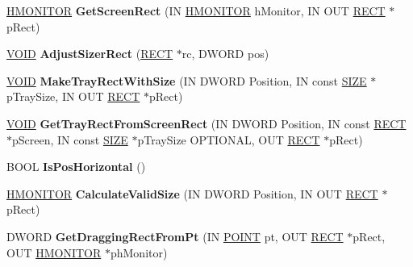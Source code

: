 \begin{DoxyCompactItemize}
\item 
\mbox{\label{class_c_tray_window_a537c0eb82c4cf33f8b74626dc779aaab}} 
\hyperlink{interfacevoid}{H\+M\+O\+N\+I\+T\+OR} {\bfseries Get\+Screen\+Rect} (IN \hyperlink{interfacevoid}{H\+M\+O\+N\+I\+T\+OR} h\+Monitor, IN O\+UT \hyperlink{structtag_r_e_c_t}{R\+E\+CT} $\ast$p\+Rect)
\item 
\mbox{\label{class_c_tray_window_a72dd55c66879592d4effddc7b0a1e25b}} 
\hyperlink{interfacevoid}{V\+O\+ID} {\bfseries Adjust\+Sizer\+Rect} (\hyperlink{structtag_r_e_c_t}{R\+E\+CT} $\ast$rc, D\+W\+O\+RD pos)
\item 
\mbox{\label{class_c_tray_window_abf218198c8b972db23f5551d493c8430}} 
\hyperlink{interfacevoid}{V\+O\+ID} {\bfseries Make\+Tray\+Rect\+With\+Size} (IN D\+W\+O\+RD Position, IN const \hyperlink{structtag_s_i_z_e}{S\+I\+ZE} $\ast$p\+Tray\+Size, IN O\+UT \hyperlink{structtag_r_e_c_t}{R\+E\+CT} $\ast$p\+Rect)
\item 
\mbox{\label{class_c_tray_window_ad9d25ce7a2a612219be8ea07c96a9af0}} 
\hyperlink{interfacevoid}{V\+O\+ID} {\bfseries Get\+Tray\+Rect\+From\+Screen\+Rect} (IN D\+W\+O\+RD Position, IN const \hyperlink{structtag_r_e_c_t}{R\+E\+CT} $\ast$p\+Screen, IN const \hyperlink{structtag_s_i_z_e}{S\+I\+ZE} $\ast$p\+Tray\+Size O\+P\+T\+I\+O\+N\+AL, O\+UT \hyperlink{structtag_r_e_c_t}{R\+E\+CT} $\ast$p\+Rect)
\item 
\mbox{\label{class_c_tray_window_a6b4dc15e30af4f71832f498e6d29c84d}} 
B\+O\+OL {\bfseries Is\+Pos\+Horizontal} ()
\item 
\mbox{\label{class_c_tray_window_a7893aab462204c267634d5d6a88221d9}} 
\hyperlink{interfacevoid}{H\+M\+O\+N\+I\+T\+OR} {\bfseries Calculate\+Valid\+Size} (IN D\+W\+O\+RD Position, IN O\+UT \hyperlink{structtag_r_e_c_t}{R\+E\+CT} $\ast$p\+Rect)
\item 
\mbox{\label{class_c_tray_window_a2093046be5e0ba6ee17e82bfed3b3352}} 
D\+W\+O\+RD {\bfseries Get\+Dragging\+Rect\+From\+Pt} (IN \hyperlink{structtag_p_o_i_n_t}{P\+O\+I\+NT} pt, O\+UT \hyperlink{structtag_r_e_c_t}{R\+E\+CT} $\ast$p\+Rect, O\+UT \hyperlink{interfacevoid}{H\+M\+O\+N\+I\+T\+OR} $\ast$ph\+Monitor)

\end{DoxyCompactItemize}
